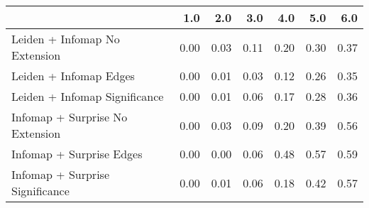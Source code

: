 \begin{tabular}{lrrrrrr}
\toprule
{} &  1.0 &  2.0 &  3.0 &  4.0 &  5.0 &  6.0 \\
\midrule
Leiden + Infomap No Extension   & 0.00 & 0.03 & 0.11 & 0.20 & 0.30 & 0.37 \\
Leiden + Infomap Edges          & 0.00 & 0.01 & 0.03 & 0.12 & 0.26 & 0.35 \\
Leiden + Infomap Significance   & 0.00 & 0.01 & 0.06 & 0.17 & 0.28 & 0.36 \\
Infomap + Surprise No Extension & 0.00 & 0.03 & 0.09 & 0.20 & 0.39 & 0.56 \\
Infomap + Surprise Edges        & 0.00 & 0.00 & 0.06 & 0.48 & 0.57 & 0.59 \\
Infomap + Surprise Significance & 0.00 & 0.01 & 0.06 & 0.18 & 0.42 & 0.57 \\
\bottomrule
\end{tabular}
